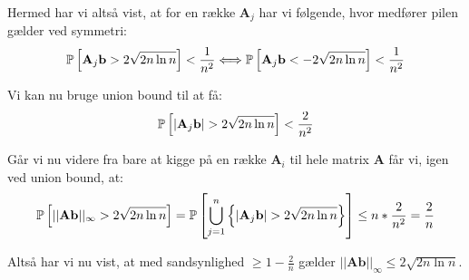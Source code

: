 Hermed har vi altså vist, at for en række $\mathbf A_j$ har vi følgende, hvor medfører pilen gælder ved symmetri:
$$
\P{\mathbf A_j \mathbf b > 2 \sqrt{2 n \ln n}} < \frac{1}{n^2}
\Longleftrightarrow
\P{\mathbf A_j \mathbf b < - 2 \sqrt{2 n \ln n}} < \frac{1}{n^2}
$$

Vi kan nu bruge union bound til at få:
$$
\P{|\mathbf A_j \mathbf b| > 2 \sqrt{2 n \ln n}} < \frac{2}{n^2}
$$

Går vi nu videre fra bare at kigge på en række $\mathbf A_i$ til hele matrix $\mathbf A$ får vi, igen ved union bound, at:
\begin{align*}
  \P{||\mathbf{Ab}||_\infty > 2 \sqrt{2 n \ln n}}
  = \P{ \bigcup_{j=1}^n  \curly{|\mathbf A_j \mathbf b| > 2 \sqrt{2 n \ln n}} }
  \leq n * \frac{2}{n^2}
  = \frac{2}{n}
\end{align*}



Altså har vi nu vist, at med sandsynlighed $\geq 1 - \frac{2}{n}$ gælder $||\mathbf{Ab}||_\infty \leq 2 \sqrt{2 n \ln n}$.










